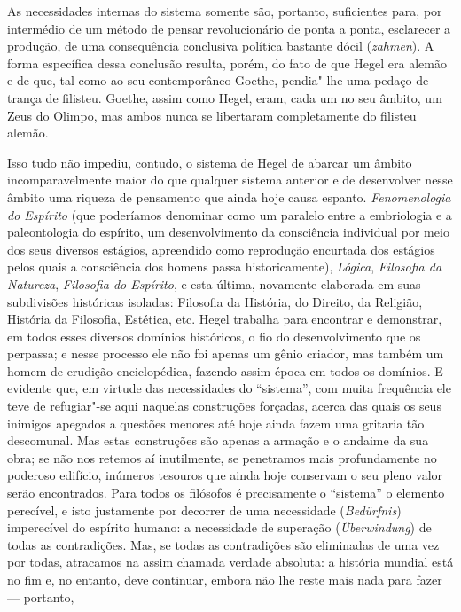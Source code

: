 As necessidades internas do sistema somente são, portanto, suficientes
para, por intermédio de um método de pensar revolucionário de ponta a
ponta, esclarecer a produção, de uma consequência conclusiva política
bastante dócil (\emph{zahmen}). A forma específica dessa conclusão
resulta, porém, do fato de que Hegel era alemão e de que, tal como ao seu
contemporâneo Goethe, pendia"-lhe uma pedaço de trança de filisteu. Goethe, assim como Hegel, eram, cada um no seu âmbito, um Zeus do Olimpo, mas ambos nunca se
libertaram completamente do filisteu alemão.

Isso tudo não impediu, contudo, o sistema
de Hegel de abarcar um âmbito incomparavelmente maior do que qualquer sistema
anterior e de desenvolver nesse âmbito uma riqueza de pensamento que
ainda hoje causa espanto. \emph{Fenomenologia do Espírito} (que
poderíamos denominar como um paralelo entre a embriologia e a
paleontologia do espírito, um desenvolvimento da consciência individual
por meio dos seus diversos estágios, apreendido como reprodução
encurtada dos estágios pelos quais a consciência dos homens passa
historicamente), \emph{Lógica}, \emph{Filosofia da Natureza},
\emph{Filosofia do Espírito}, e esta última, novamente elaborada em suas
subdivisões históricas isoladas: Filosofia da História, do Direito, da
Religião, História da Filosofia, Estética, etc.
Hegel trabalha
para encontrar e demonstrar, em todos esses diversos domínios
históricos, o fio do desenvolvimento que os perpassa; e nesse processo
ele não foi apenas um gênio criador, mas também um homem de erudição
enciclopédica, fazendo assim época em todos os domínios. E evidente que,
em virtude das necessidades do ``sistema'', com muita frequência ele
teve de refugiar"-se aqui naquelas construções forçadas, acerca das quais
os seus inimigos apegados a questões menores até hoje ainda fazem uma
gritaria tão descomunal. Mas estas construções são apenas a armação e o
andaime da sua obra; se não nos retemos aí inutilmente, se penetramos
mais profundamente no poderoso edifício, inúmeros tesouros que ainda
hoje conservam o seu pleno valor serão encontrados. Para todos os
filósofos é precisamente o ``sistema'' o elemento perecível, e isto
justamente por decorrer de uma necessidade (\emph{Bedürfnis})
imperecível do espírito humano: a necessidade de superação
(\emph{Überwindung}) de todas as contradições. Mas, se todas as
contradições são eliminadas de uma vez por todas, atracamos na assim
chamada verdade absoluta: a história mundial está no fim e, no entanto,
deve continuar, embora não lhe reste mais nada para fazer --- portanto,
